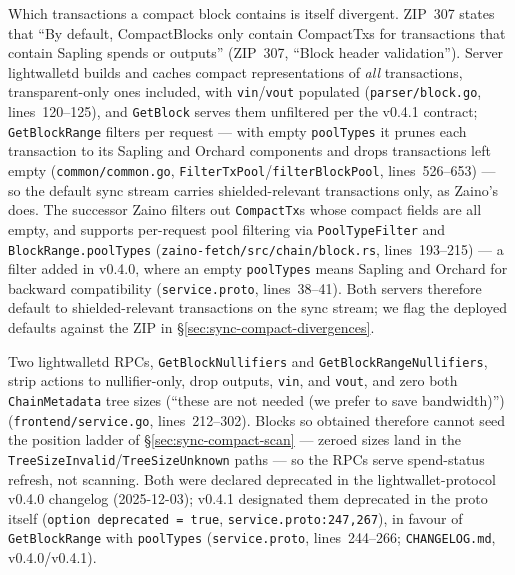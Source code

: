 \documentclass[11pt,a4paper]{article}
\theoremstyle{definition}
\begin{document}
Which transactions a compact block contains is itself divergent. ZIP~307
states that ``By default, CompactBlocks only contain CompactTxs for
transactions that contain Sapling spends or outputs'' (ZIP~307, ``Block
header validation''). Server \textsf{lightwalletd} builds and caches
compact representations of \emph{all} transactions, transparent-only ones
included, with \texttt{vin}/\texttt{vout} populated
(\texttt{parser/block.go}, lines~120--125), and \texttt{GetBlock} serves
them unfiltered per the v0.4.1 contract; \texttt{GetBlockRange} filters
per request --- with empty \texttt{poolTypes} it prunes each transaction
to its Sapling and Orchard components and drops transactions left empty
(\texttt{common/common.go},
\texttt{FilterTxPool}/\texttt{filterBlockPool}, lines~526--653) --- so
the default sync stream carries shielded-relevant transactions only, as
Zaino's does. The successor \textsf{Zaino}
filters out \texttt{CompactTx}s whose
compact fields are all empty, and supports per-request pool filtering via
\texttt{PoolTypeFilter} and \texttt{BlockRange.poolTypes}
(\texttt{zaino-fetch/src/chain/block.rs}, lines~193--215) --- a filter added
in v0.4.0, where an empty \texttt{poolTypes} means Sapling and Orchard for
backward compatibility (\texttt{service.proto}, lines~38--41). Both
servers therefore default to shielded-relevant transactions on the sync
stream; we flag the deployed defaults against the ZIP in
\S\ref{sec:sync-compact-divergences}.

Two \textsf{lightwalletd} RPCs, \texttt{GetBlockNullifiers} and
\texttt{GetBlockRangeNullifiers}, strip actions to nullifier-only, drop
outputs, \texttt{vin}, and \texttt{vout}, and zero both
\texttt{ChainMetadata} tree sizes (``these are not needed (we prefer to
save bandwidth)'') (\texttt{frontend/service.go}, lines~212--302). Blocks
so obtained therefore cannot seed the position ladder of
\S\ref{sec:sync-compact-scan} --- zeroed sizes land in the
\texttt{TreeSizeInvalid}/\texttt{TreeSizeUnknown} paths --- so the RPCs
serve spend-status refresh, not scanning. Both were declared deprecated
in the \textsf{lightwallet-protocol} v0.4.0 changelog (2025-12-03);
v0.4.1 designated them deprecated in the proto itself
(\texttt{option deprecated = true}, \texttt{service.proto:247,267}), in
favour of \texttt{GetBlockRange} with \texttt{poolTypes}
(\texttt{service.proto}, lines~244--266;
\texttt{CHANGELOG.md}, v0.4.0/v0.4.1).
\end{document}
